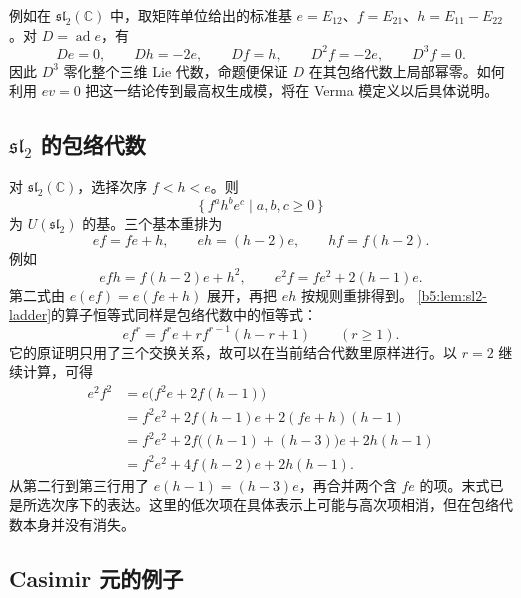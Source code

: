 \ProseParagraphBreak
例如在 \(\mathfrak{sl}_2(\mathbb C)\) 中，取矩阵单位给出的标准基 \(e=E_{12}\)、\(f=E_{21}\)、\(h=E_{11}-E_{22}\)。对 \(D=\operatorname{ad}e\)，有
\[
	De=0,\qquad Dh=-2e,\qquad Df=h,\qquad D^2f=-2e,\qquad D^3f=0.
\]
因此 \(D^3\) 零化整个三维 Lie 代数，命题便保证 \(D\) 在其包络代数上局部幂零。如何利用 \(ev=0\) 把这一结论传到最高权生成模，将在 Verma 模定义以后具体说明。

\subsection{\texorpdfstring{\(\mathfrak{sl}_2\) 的包络代数}{sl2 的包络代数}}
\label{b5:subsec:1503:02}

对 \(\mathfrak{sl}_2(\mathbb C)\)，选择次序 \(f<h<e\)。则
\[
	\{\,f^a h^b e^c\mid a,b,c\ge0\,\}
\]
为 \(U(\mathfrak{sl}_2)\) 的基。三个基本重排为
\[
	ef=fe+h,\qquad eh=(h-2)e,\qquad hf=f(h-2).
\]
例如
\[
	efh=f(h-2)e+h^2,\qquad e^2f=fe^2+2(h-1)e.
\]
第二式由 \(e(ef)=e(fe+h)\) 展开，再把 \(eh\) 按规则重排得到。
\ProseParagraphBreak
\cref{b5:lem:sl2-ladder}的算子恒等式同样是包络代数中的恒等式：
\[
	ef^r=f^re+r f^{r-1}(h-r+1)\qquad(r\ge1).
\]
它的原证明只用了三个交换关系，故可以在当前结合代数里原样进行。以 \(r=2\) 继续计算，可得
\[
	\begin{aligned}
		e^2f^2 &=e\bigl(f^2e+2f(h-1)\bigr)\\
		&=f^2e^2+2f(h-1)e+2(fe+h)(h-1)\\
		&=f^2e^2+2f\bigl((h-1)+(h-3)\bigr)e+2h(h-1)\\
		&=f^2e^2+4f(h-2)e+2h(h-1).
	\end{aligned}
\]
从第二行到第三行用了 \(e(h-1)=(h-3)e\)，再合并两个含 \(fe\) 的项。末式已是所选次序下的表达。这里的低次项在具体表示上可能与高次项相消，但在包络代数本身并没有消失。

\subsection{Casimir 元的例子}
\label{b5:subsec:1503:03}

